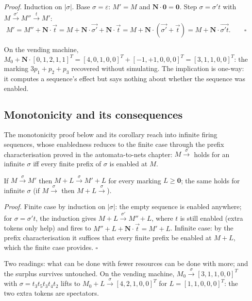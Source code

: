 \textit{Proof.} Induction on $|\sigma|$. Base $\sigma = \varepsilon$: $M' = M$ and $\mathbf{N} \cdot \mathbf{0} = \mathbf{0}$. Step $\sigma = \sigma' t$ with $M \xrightarrow{\sigma'} M'' \xrightarrow{t} M'$:
\[
M' = M'' + \mathbf{N} \cdot \vec{t} = M + \mathbf{N} \cdot \vec{\sigma'} + \mathbf{N} \cdot \vec{t} = M + \mathbf{N} \cdot (\vec{\sigma'} + \vec{t}) = M + \mathbf{N} \cdot \vec{\sigma' t}. \qquad \square
\]

On the vending machine, $M_0 + \mathbf{N} \cdot [0,1,2,1,1]^T = [4,0,1,0,0]^T + [-1,+1,0,0,0]^T = [3,1,1,0,0]^T$: the marking $3p_1 + p_2 + p_3$ recovered without simulating. The implication is one-way: it computes a sequence's effect but says nothing about whether the sequence was enabled.

\subsection{Monotonicity and its consequences}

The monotonicity proof below and its corollary reach into infinite firing sequences, whose enabledness reduces to the finite case through the prefix characterisation proved in the automata-to-nets chapter: $M \xrightarrow{\sigma}$ holds for an infinite $\sigma$ iff every finite prefix of $\sigma$ is enabled at $M$.

\begin{lemma}[Monotonicity]
If $M \xrightarrow{\sigma} M'$ then $M + L \xrightarrow{\sigma} M' + L$ for every marking $L \geq \mathbf{0}$; the same holds for infinite $\sigma$ (if $M \xrightarrow{\sigma}$ then $M + L \xrightarrow{\sigma}$).
\end{lemma}

\textit{Proof.} Finite case by induction on $|\sigma|$: the empty sequence is enabled anywhere; for $\sigma = \sigma' t$, the induction gives $M + L \xrightarrow{\sigma'} M'' + L$, where $t$ is still enabled (extra tokens only help) and fires to $M'' + L + \mathbf{N} \cdot \vec{t} = M' + L$. Infinite case: by the prefix characterisation it suffices that every finite prefix be enabled at $M + L$, which the finite case provides. \hfill$\square$

Two readings: what can be done with fewer resources can be done with more; and the surplus survives untouched. On the vending machine, $M_0 \xrightarrow{\sigma} [3,1,1,0,0]^T$ with $\sigma = t_3 t_5 t_3 t_4 t_2$ lifts to $M_0 + L \xrightarrow{\sigma} [4,2,1,0,0]^T$ for $L = [1,1,0,0,0]^T$: the two extra tokens are spectators.

